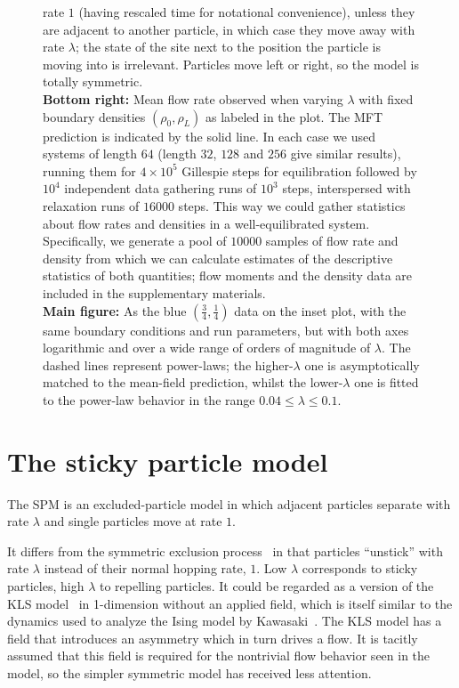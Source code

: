\documentclass[
reprint, amsmath,amssymb, aps,
 prx,
]{revtex4-1}
\begin{document}
\begin{figure}[h!]
{  rate $1$ (having rescaled time for notational convenience), unless
  they are adjacent to another particle, in
  which case they move away with rate $\lambda$; the state of the site next
  to the position the particle is moving into is irrelevant.
  Particles move left or right, so the
  model is totally symmetric.\\ \textbf{Bottom right:} Mean flow rate
  observed when varying $\lambda$ with fixed boundary densities
  $(\rho_0, \rho_L)$ as labeled in the plot.  The MFT
  prediction is indicated by the solid line.  In each case we used
  systems of length $64$ (length $32$, $128$ and $256$ give similar
  results), running them for $4\times10^5$ Gillespie steps for
  equilibration followed by $10^4$ independent data gathering runs of
  $10^3$ steps, interspersed with relaxation runs of $16000$
  steps. This way we could gather statistics about flow rates and
  densities in a well-equilibrated system. Specifically, we generate a
  pool of $10000$ samples of flow rate and density from which we can
  calculate estimates of the descriptive statistics of both
  quantities; flow moments and the density data are included in the
  supplementary materials.\\ \textbf{Main figure:} As the blue $\left(
  \frac{3}{4} , \frac{1}{4} \right)$ data on the inset plot, with the
  same boundary conditions and run parameters, but with both axes
  logarithmic and over a wide range of orders of magnitude of
  $\lambda$.  The dashed lines represent power-laws; the
  higher-$\lambda$ one is asymptotically matched to the mean-field
  prediction, whilst the lower-$\lambda$ one is fitted to the
  power-law behavior in the range $0.04 \le \lambda \le 0.1$.
\vspace{1em}}
\end{figure}
\fi



\section{The sticky particle model} \label{sec:modelDefn}

The SPM is an excluded-particle model in which adjacent particles
separate with rate $\lambda$ and single particles move at rate $1$.


It differs from the symmetric exclusion
process~\cite{sugden2007dynamically, Kollmann2003, Lin2005,
  Hegde2014,Krapivsky2014, Imamura2017} in that particles ``unstick''
with rate $\lambda$ instead of their normal hopping rate, $1$.  Low
$\lambda$ corresponds to sticky particles, high $\lambda$ to repelling
particles.
It could be regarded as a version of the KLS model~\cite{Katz1984,
  Zia2010, Kafri2003} in 1-dimension without an applied field, which
is itself similar to the dynamics used to analyze the Ising model by
Kawasaki~\cite{PhysRev.145.224}.  The KLS model has a field that
introduces an asymmetry which in turn drives a flow.  It is tacitly assumed
that this field is required for the nontrivial flow behavior seen in
the model, so the simpler symmetric model has received less attention.
\end{document}
